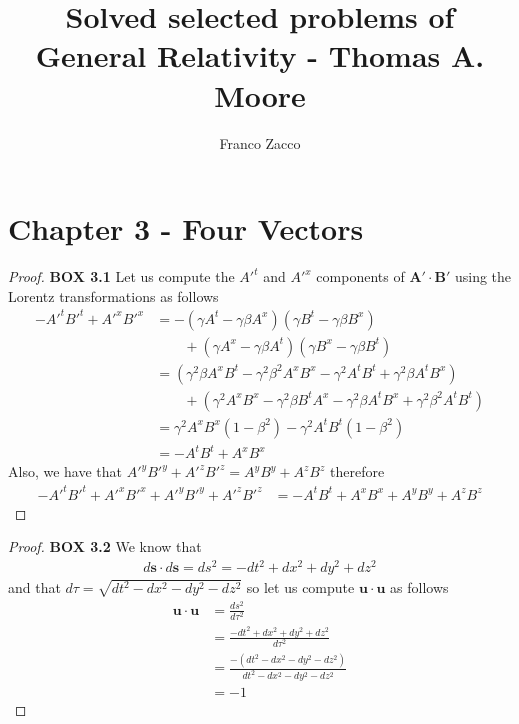 \documentclass[11pt]{article}
\title{\textbf{Solved selected problems of General Relativity - Thomas A. Moore}}
\author{Franco Zacco}
\date{}
\theoremstyle{definition}
\begin{document}
\maketitle
\thispagestyle{empty}

\section*{Chapter 3 - Four Vectors}

\begin{proof}{\textbf{BOX 3.1}}
    Let us compute the ${A'}^t$ and ${A'}^x$ components of $\bm{A'}\cdot \bm{B'}$ using the Lorentz
    transformations as follows
    \begin{align*}
        -{A'}^t {B'}^t + {A'}^x {B'}^x
        &= -(\gamma A^t - \gamma\beta A^x)(\gamma B^t - \gamma\beta B^x)\\
        &\quad\quad + (\gamma A^x - \gamma\beta A^t)(\gamma B^x - \gamma\beta B^t)\\
        &= (\gamma^2\beta A^x B^t - \gamma^2\beta^2 A^x B^x
        - \gamma^2A^t B^t + \gamma^2\beta A^tB^x)\\
        &\quad\quad +(\gamma^2A^xB^x - \gamma^2\beta B^tA^x
        - \gamma^2\beta A^t B^x + \gamma^2\beta^2 A^t B^t)\\
        &= \gamma^2A^xB^x(1 - \beta^2) - \gamma^2A^tB^t(1 - \beta^2)\\
        &= -A^tB^t + A^xB^x
    \end{align*}
    Also, we have that ${A'}^y{B'}^y + {A'}^z{B'}^z = {A}^yB^y + {A}^zB^z$
    therefore
    \begin{align*}
        -{A'}^t {B'}^t + {A'}^x {B'}^x + {A'}^y{B'}^y + {A'}^z{B'}^z
        &= -A^tB^t + A^xB^x + {A}^yB^y + {A}^zB^z
    \end{align*}
\end{proof}
\begin{proof}{\textbf{BOX 3.2}}
    We know that
    \begin{align*}
        d\bm{s} \cdot d\bm{s} = ds^2 = -dt^2 + dx^2 + dy^2 + dz^2
    \end{align*}
    and that $d\tau = \sqrt{dt^2 - dx^2 - dy^2 - dz^2}$
    so let us compute $\bm{u} \cdot \bm{u}$ as follows
    \begin{align*}
        \bm{u} \cdot \bm{u} &= \frac{ds^2}{d\tau^2}\\
        &= \frac{-dt^2 + dx^2 + dy^2 + dz^2}{d\tau^2}\\
        &= \frac{-(dt^2 - dx^2 - dy^2 - dz^2)}{dt^2 - dx^2 - dy^2 - dz^2}\\
        &= -1
    \end{align*}
\end{proof}
\end{document}
